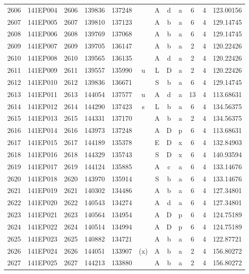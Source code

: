 \begin{tabular}{|*{12}{c|}}
2606 & 141EP004 & 2606 & 139836 & 137248 &  & A & d & a & 6 & 4 & 123.00156 \\ 
2607 & 141EP005 & 2607 & 139810 & 137123 &  & A & b & a & 6 & 4 & 129.14745 \\ 
2608 & 141EP006 & 2608 & 139769 & 137068 &  & A & b & a & 6 & 4 & 129.14745 \\ 
2609 & 141EP007 & 2609 & 139705 & 136147 &  & A & b & a & 2 & 4 & 120.22426 \\ 
2610 & 141EP008 & 2610 & 139565 & 136135 &  & A & d & a & 2 & 4 & 120.22426 \\ 
2611 & 141EP009 & 2611 & 139557 & 135990 & u & L & D & a & 2 & 4 & 120.22426 \\ 
2612 & 141EP010 & 2612 & 139836 & 136671 &  & S & b & a & 6 & 4 & 129.14745 \\ 
2613 & 141EP011 & 2613 & 144054 & 137577 & u & A & d & a & 13 & 4 & 113.68631 \\ 
2614 & 141EP012 & 2614 & 144290 & 137423 & s & L & b & a & 6 & 4 & 134.56375 \\ 
2615 & 141EP013 & 2615 & 144331 & 137170 &  & A & b & a & 2 & 4 & 134.56375 \\ 
2616 & 141EP014 & 2616 & 143973 & 137248 &  & A & D & p & 6 & 4 & 113.68631 \\ 
2617 & 141EP015 & 2617 & 144189 & 135378 &  & E & D & x & 6 & 4 & 132.84903 \\ 
2618 & 141EP016 & 2618 & 144329 & 135743 &  & S & D & x & 6 & 4 & 140.93594 \\ 
2619 & 141EP017 & 2619 & 144124 & 135885 &  & A & c & a & 6 & 4 & 133.14676 \\ 
2620 & 141EP018 & 2620 & 143970 & 135914 &  & S & b & a & 6 & 4 & 133.14676 \\ 
2621 & 141EP019 & 2621 & 140302 & 134486 &  & A & b & a & 6 & 4 & 127.34801 \\ 
2622 & 141EP020 & 2622 & 140543 & 134274 &  & A & d & a & 6 & 4 & 127.34801 \\ 
2623 & 141EP021 & 2623 & 140564 & 134954 &  & A & D & p & 6 & 4 & 124.75189 \\ 
2624 & 141EP022 & 2624 & 140514 & 134994 &  & A & D & p & 6 & 4 & 124.75189 \\ 
2625 & 141EP023 & 2625 & 140882 & 134721 &  & A & b & a & 6 & 4 & 122.87721 \\ 
2626 & 141EP024 & 2626 & 144051 & 133907 & (x) & A & b & a & 2 & 4 & 156.80272 \\ 
2627 & 141EP025 & 2627 & 144213 & 133880 &  & A & b & a & 2 & 4 & 156.80272 \\ 

\end{tabular}
